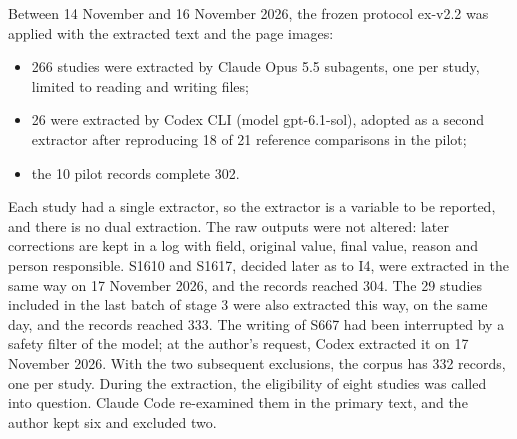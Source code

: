 Between 14 November and 16 November 2026, the frozen protocol ex-v2.2 was applied with the extracted text and the page images:
\begin{itemize}
  \item 266 studies were extracted by Claude Opus 5.5 subagents, one per study, limited to reading and writing files;
  \item 26 were extracted by Codex CLI (model gpt-6.1-sol), adopted as a second extractor after
  reproducing 18 of 21 reference comparisons in the pilot;
  \item the 10 pilot records complete 302.
\end{itemize}
Each study had a single extractor, so the extractor is a variable to be reported, and there is no dual extraction. The
raw outputs were not altered: later corrections are kept in a log with field, original value, final
value, reason and person responsible. S1610 and S1617, decided later as to I4, were extracted in the same way on
17 November 2026, and the records reached 304. The 29 studies included in the last batch of stage 3 were also extracted
this way, on the same day, and the records reached 333. The writing of S667 had
been interrupted by a safety filter of the model; at the author's request, Codex extracted it on 17 November 2026. With the
two subsequent exclusions, the corpus has 332 records, one per study. During the
extraction, the eligibility of eight studies was called into question. Claude Code re-examined them in the primary text, and the
author kept six and excluded two.

